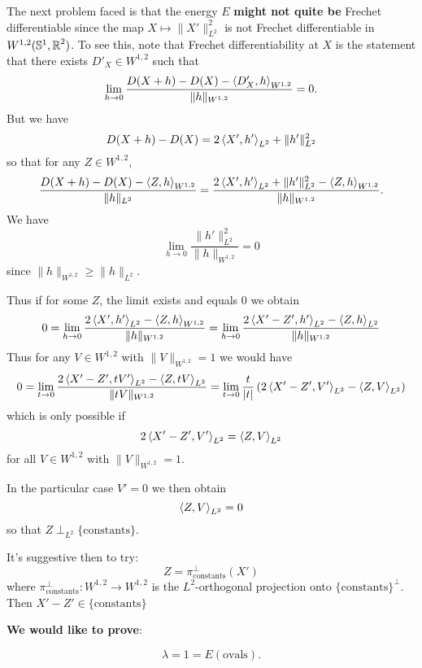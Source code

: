 \documentclass[12pt]{article}
\begin{document}
The next problem faced is that the energy \(E\) \textbf{might not quite be} Frechet differentiable since the map \(X \mapsto \|X'\|_{L^2}^2\) is not Frechet differentiable in \(W^{1,2} (\operatorname{\mathbb{S}^1}, \operatorname{\mathbb{R}}^2)\). To see this, note that Frechet differentiability at \(X\) is the statement that there exists \(D'_X \in W^{1,2}\) such that
\[
\lim_{h \to 0} \frac{D(X + h) - D(X) - \left\langle{D'_X},{h}\right\rangle_{W^{1,2}}}{\|h\|_{W^{1,2}}} = 0.
\]
But we have
\[
D(X + h) - D(X) = 2 \left\langle{X'},{h'}\right\rangle_{L^2} + \|h'\|^2_{L^2}
\]
so that for any \(Z \in W^{1,2}\),
\[
\frac{D(X + h) - D(X) - \left\langle{Z},{h}\right\rangle_{W^{1,2}}}{\|h\|_{L^2}} = \frac{2 \left\langle{X'},{h'}\right\rangle_{L^2} + \|h'\|^2_{L^2} - \left\langle{Z},{h}\right\rangle_{W^{1,2}}}{\|h\|_{W^{1,2}}}.
\]
We have
\[
\lim_{h\to 0} \frac{\|h'\|^2_{L^2}}{\|h\|_{W^{1,2}}} = 0
\]
since \(\|h\|_{W^{1,2}} \geq \|h\|_{L^2}\).

Thus if for some \(Z\), the limit exists and equals \(0\) we obtain
\[
0 = \lim_{h\to 0} \frac{2 \left\langle{X'},{h'}\right\rangle_{L^2} - \left\langle{Z},{h}\right\rangle_{W^{1,2}}}{\|h\|_{W^{1,2}}} = \lim_{h\to 0} \frac{2 \left\langle{X' - Z'},{h'}\right\rangle_{L^2} - \left\langle{Z},{h}\right\rangle_{L^2}}{\|h\|_{W^{1,2}}}
\]
Thus for any \(V \in W^{1,2}\) with \(\|V\|_{W^{1,2}} = 1\) we would have
\[
0 = \lim_{t\to 0} \frac{2 \left\langle{X' - Z'},{tV'}\right\rangle_{L^2} - \left\langle{Z},{tV}\right\rangle_{L^2}}{\|tV\|_{W^{1,2}}} = \lim_{t\to 0} \frac{t}{|t|} \left(2 \left\langle{X' - Z'},{V'}\right\rangle_{L^2} - \left\langle{Z},{V}\right\rangle_{L^2}\right)
\]
which is only possible if
\[
2 \left\langle{X' - Z'},{V'}\right\rangle_{L^2} = \left\langle{Z},{V}\right\rangle_{L^2}
\]
for all \(V \in W^{1,2}\) with \(\|V\|_{W^{1,2}} = 1\).

In the particular case \(V' = 0\) we then obtain
\[
\left\langle{Z},{V}\right\rangle_{L^2} = 0
\]
so that \(Z \perp_{L^2} \lbrace \text{constants} \rbrace\).

It's suggestive then to try:
\[
Z = \pi^{\perp}_{\text{constants}} (X')
\]
where \(\pi^{\perp}_{\text{constants}} : W^{1,2} \to W^{1,2}\) is the \(L^2\)-orthogonal projection onto \(\lbrace \text{constants}\rbrace^{\perp}\). Then \(X' - Z' \in \lbrace \text{constants}\rbrace\)

\textbf{We would like to prove}:

\begin{theorem}
\[
\lambda = 1 = E(\text{ovals}).
\]
\end{theorem}
\end{document}
